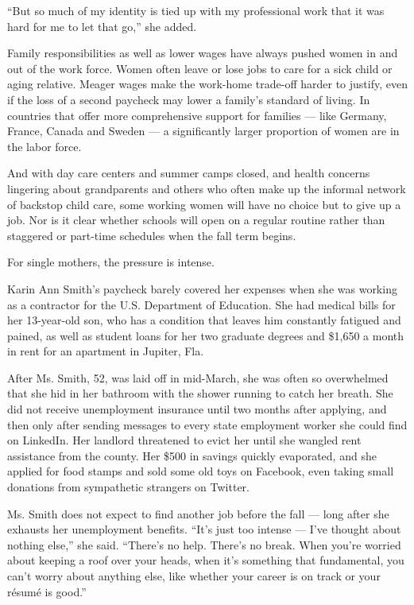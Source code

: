 ``But so much of my identity is tied up with my professional work that
it was hard for me to let that go,'' she added.

Family responsibilities as well as lower wages have always pushed women
in and out of the work force. Women often leave or lose jobs to care for
a sick child or aging relative. Meager wages make the work-home
trade-off harder to justify, even if the loss of a second paycheck may
lower a family's standard of living. In countries that offer more
comprehensive support for families --- like Germany, France, Canada and
Sweden --- a significantly larger proportion of women are in the labor
force.

And with day care centers and summer camps closed, and health concerns
lingering about grandparents and others who often make up the informal
network of backstop child care, some working women will have no choice
but to give up a job. Nor is it clear whether schools will open on a
regular routine rather than staggered or part-time schedules when the
fall term begins.

For single mothers, the pressure is intense.

Karin Ann Smith's paycheck barely covered her expenses when she was
working as a contractor for the U.S. Department of Education. She had
medical bills for her 13-year-old son, who has a condition that leaves
him constantly fatigued and pained, as well as student loans for her two
graduate degrees and \$1,650 a month in rent for an apartment in
Jupiter, Fla.

After Ms. Smith, 52, was laid off in mid-March, she was often so
overwhelmed that she hid in her bathroom with the shower running to
catch her breath. She did not receive unemployment insurance until two
months after applying, and then only after sending messages to every
state employment worker she could find on LinkedIn. Her landlord
threatened to evict her until she wangled rent assistance from the
county. Her \$500 in savings quickly evaporated, and she applied for
food stamps and sold some old toys on Facebook, even taking small
donations from sympathetic strangers on Twitter.

Ms. Smith does not expect to find another job before the fall --- long
after she exhausts her unemployment benefits. ``It's just too intense
--- I've thought about nothing else,'' she said. ``There's no help.
There's no break. When you're worried about keeping a roof over your
heads, when it's something that fundamental, you can't worry about
anything else, like whether your career is on track or your résumé is
good.''

